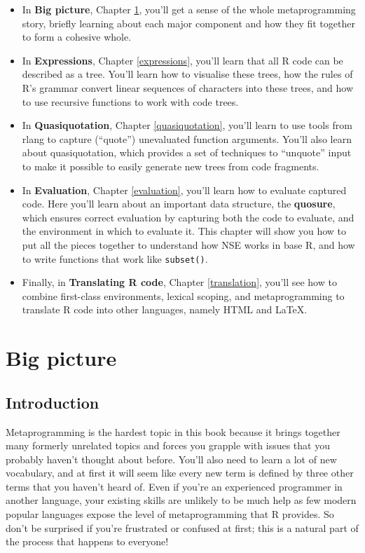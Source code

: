 \documentclass[]{book}
\begin{document}
\begin{itemize}
\item
  In \textbf{Big picture}, Chapter \ref{meta-big-picture}, you'll get a sense of
  the whole metaprogramming story, briefly learning about each major component
  and how they fit together to form a cohesive whole.
\item
  In \textbf{Expressions}, Chapter \ref{expressions}, you'll learn that all R code
  can be described as a tree. You'll learn how to visualise these trees, how
  the rules of R's grammar convert linear sequences of characters into these
  trees, and how to use recursive functions to work with code trees.
\item
  In \textbf{Quasiquotation}, Chapter \ref{quasiquotation}, you'll learn to use
  tools from rlang to capture (``quote'') unevaluated function arguments. You'll
  also learn about quasiquotation, which provides a set of techniques to
  ``unquote'' input to make it possible to easily generate new trees from
  code fragments.
\item
  In \textbf{Evaluation}, Chapter \ref{evaluation}, you'll learn how to evaluate
  captured code. Here you'll learn about an important data structure, the
  \textbf{quosure}, which ensures correct evaluation by capturing both the code
  to evaluate, and the environment in which to evaluate it. This chapter will
  show you how to put all the pieces together to understand how NSE works in
  base R, and how to write functions that work like \texttt{subset()}.
\item
  Finally, in \textbf{Translating R code}, Chapter \ref{translation}, you'll see
  how to combine first-class environments, lexical scoping, and metaprogramming
  to translate R code into other languages, namely HTML and LaTeX.
\end{itemize}

\hypertarget{meta-big-picture}{%
\chapter{Big picture}\label{meta-big-picture}}

\hypertarget{introduction-1}{%
\section{Introduction}\label{introduction-1}}

Metaprogramming is the hardest topic in this book because it brings together many formerly unrelated topics and forces you grapple with issues that you probably haven't thought about before. You'll also need to learn a lot of new vocabulary, and at first it will seem like every new term is defined by three other terms that you haven't heard of. Even if you're an experienced programmer in another language, your existing skills are unlikely to be much help as few modern popular languages expose the level of metaprogramming that R provides. So don't be surprised if you're frustrated or confused at first; this is a natural part of the process that happens to everyone!
\end{document}
